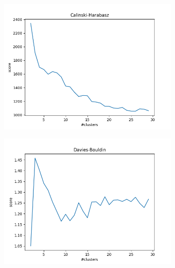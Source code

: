 \documentclass{article}
\begin{document}
\begin{figure}[H]
\begin{subfigure}{.33\textwidth}
  \centering
  \includegraphics[width=1\linewidth]{2f/Cats/Calinski.png}  
  
  \label{fig:sub-first}
\end{subfigure}
\begin{subfigure}{.33\textwidth}
  \centering
  \includegraphics[width=1\linewidth]{2f/Cats/Davies.png}  
  

\end{subfigure}
\end{figure}
\end{document}
